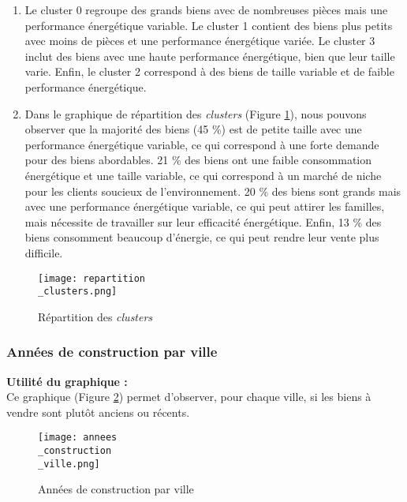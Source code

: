 \documentclass[a4paper, 12pt, twoside]{report}
\begin{document}
			\begin{enumerate}
				\item Le cluster 0 regroupe des grands biens avec de nombreuses pièces mais une performance énergétique variable. Le cluster 1 contient des biens plus petits avec moins de pièces et une performance énergétique variée. Le cluster 3 inclut des biens avec une haute performance énergétique, bien que leur taille varie. Enfin, le cluster 2 correspond à des biens de taille variable et de faible performance énergétique.
				\item Dans le graphique de répartition des {\it clusters} (Figure \ref{repartitionClusters}), nous pouvons observer que la majorité des biens (45 \%) est de petite taille avec une performance énergétique variable, ce qui correspond à une forte demande pour des biens abordables. 21 \% des biens ont une faible consommation énergétique et une taille variable, ce qui correspond à un marché de niche pour les clients soucieux de l'environnement. 20 \% des biens sont grands mais avec une performance énergétique variable, ce qui peut attirer les familles, mais nécessite de travailler sur leur efficacité énergétique. Enfin, 13 \% des biens consomment beaucoup d'énergie, ce qui peut rendre leur vente plus difficile.
			\end{enumerate}

			\begin{figure}[h]
				\centering
				\texttt{[image: repartition\\\_clusters.png]}
				\caption{Répartition des {\it clusters}}
				\label{repartitionClusters}
			\end{figure}

			\subsubsection{Années de construction par ville}

			{\bf Utilité du graphique :} \\

			Ce graphique (Figure \ref{anneesConstructionVille}) permet d'observer, pour chaque ville, si les biens à vendre sont plutôt anciens ou récents. \\

			\begin{figure}[h]
				\centering
				\texttt{[image: annees\\\_construction\\\_ville.png]}
				\caption{Années de construction par ville}
				\label{anneesConstructionVille}
			\end{figure}
\end{document}
